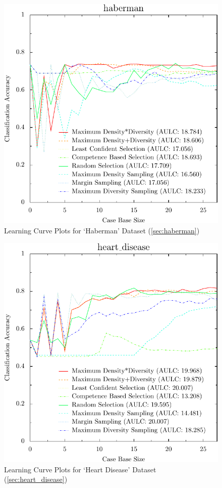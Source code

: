 \documentclass[a4paper,11pt]{report}
\begin{document}
\begin{figure}[h!]
\includegraphics{./Plots/haberman}
\caption{Learning Curve Plots for `Haberman' Dataset (\ref{sec:haberman})}
\end{figure}

\begin{figure}[h!]
\includegraphics{./Plots/heart_disease}
\caption{Learning Curve Plots for `Heart Disease' Dataset (\ref{sec:heart_disease})}
\end{figure}
\end{document}
